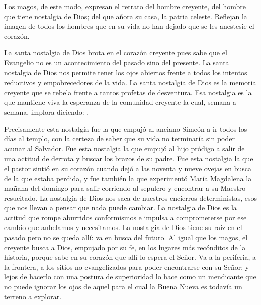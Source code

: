 {Los magos, de este modo, expresan el retrato del hombre creyente, del hombre que tiene nostalgia de Dios; del que añora su casa, la patria celeste. Reflejan la imagen de todos los hombres que en su vida no han dejado que se les anestesie el corazón.

La santa nostalgia de Dios brota en el corazón creyente pues sabe que el Evangelio no es un acontecimiento del pasado sino del presente. La santa nostalgia de Dios nos permite tener los ojos abiertos frente a todos los intentos reductivos y empobrecedores de la vida. La santa nostalgia de Dios es la memoria creyente que se rebela frente a tantos profetas de desventura. Esa nostalgia es la que mantiene viva la esperanza de la comunidad creyente la cual, semana a semana, implora diciendo: .

Precisamente esta nostalgia fue la que empujó al anciano Simeón a ir todos los días al templo, con la certeza de saber que su vida no terminaría sin poder acunar al Salvador. Fue esta nostalgia la que empujó al hijo pródigo a salir de una actitud de derrota y buscar los brazos de su padre. Fue esta nostalgia la que el pastor sintió en su corazón cuando dejó a las noventa y nueve ovejas en busca de la que estaba perdida, y fue también la que experimentó María Magdalena la mañana del domingo para salir corriendo al sepulcro y encontrar a su Maestro resucitado. La nostalgia de Dios nos saca de nuestros encierros deterministas, esos que nos llevan a pensar que nada puede cambiar. La nostalgia de Dios es la actitud que rompe aburridos conformismos e impulsa a comprometerse por ese cambio que anhelamos y necesitamos. La nostalgia de Dios tiene su raíz en el pasado pero no se queda allí: va en busca del futuro. Al igual que los magos, el creyente  busca a Dios, empujado por su fe, en los lugares más recónditos de la historia, porque sabe en su corazón que allí lo espera el Señor. Va a la periferia, a la frontera, a los sitios no evangelizados para poder encontrarse con su Señor; y lejos de hacerlo con una postura de superioridad lo hace como un mendicante que no puede ignorar los ojos de aquel para el cual la Buena Nueva es todavía un terreno a explorar.

}
